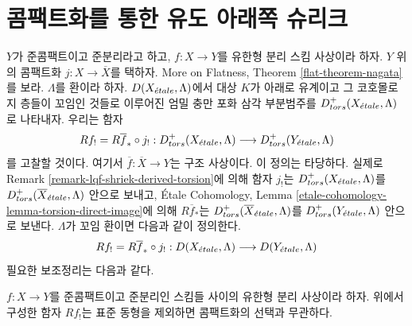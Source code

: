 \section{콤팩트화를 통한 유도 아래쪽 슈리크}
\label{section-derived-lower-shriek-compactification}

\noindent
$Y$가 준콤팩트이고 준분리라고 하고,
$f : X \to Y$를 유한형 분리 스킴 사상이라 하자.
$Y$ 위의 콤팩트화 $j : X \to \overline{X}$를 택하자.
More on Flatness, Theorem \ref{flat-theorem-nagata}를 보라.
$\Lambda$를 환이라 하자. $D(X_{\acute{e}tale}, \Lambda)$에서
대상 $K$가 아래로 유계이고 그 코호몰로지 층들이 꼬임인 것들로 이루어진
엄밀 충만 포화 삼각 부분범주를
$D^+_{tors}(X_{\acute{e}tale}, \Lambda)$로 나타내자. 우리는 함자
$$
Rf_! = R\overline{f}_* \circ j_! :
D^+_{tors}(X_{\acute{e}tale}, \Lambda)
\longrightarrow
D^+_{tors}(Y_{\acute{e}tale}, \Lambda)
$$
를 고찰할 것이다. 여기서
$\overline{f} : \overline{X} \to Y$는 구조 사상이다.
이 정의는 타당하다. 실제로 Remark
\ref{remark-lqf-shriek-derived-torsion}에 의해 함자 $j_!$는
$D^+_{tors}(X_{\acute{e}tale}, \Lambda)$를
$D^+_{tors}(\overline{X}_{\acute{e}tale}, \Lambda)$ 안으로 보내고,
\'Etale Cohomology, Lemma
\ref{etale-cohomology-lemma-torsion-direct-image}에 의해
$R\overline{f}_*$는
$D^+_{tors}(\overline{X}_{\acute{e}tale}, \Lambda)$를
$D^+_{tors}(Y_{\acute{e}tale}, \Lambda)$ 안으로 보낸다.
$\Lambda$가 꼬임 환이면 다음과 같이 정의한다.
$$
Rf_! = R\overline{f}_* \circ j_! :
D(X_{\acute{e}tale}, \Lambda)
\longrightarrow
D(Y_{\acute{e}tale}, \Lambda)
$$
필요한 보조정리는 다음과 같다.

\begin{lemma}
\label{lemma-shriek-well-defined}
$f : X \to Y$를 준콤팩트이고 준분리인 스킴들 사이의 유한형 분리
사상이라 하자. 위에서 구성한 함자 $Rf_!$는 표준 동형을 제외하면
콤팩트화의 선택과 무관하다.
\end{lemma}

